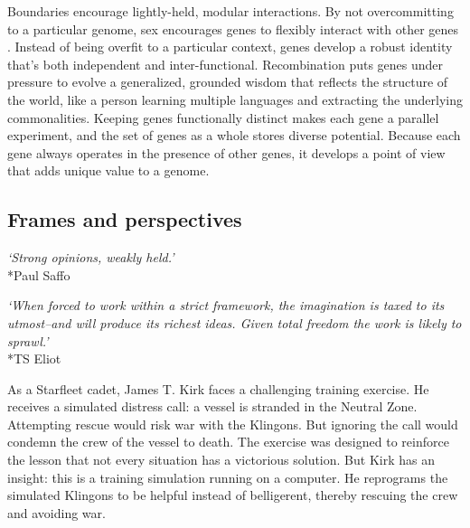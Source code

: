 \documentclass[12pt]{article}
\begin{document}
Boundaries encourage lightly-held, modular interactions. By not overcommitting to a particular genome, sex encourages genes to flexibly interact with other genes \citep{livnat2008mixability, livnat2010sex, wagner1996perspective, holland1975adaptation,dawkins1976selfish, clune2013evolutionary}. Instead of being overfit to a particular context, genes develop a robust identity that's both independent and inter-functional. Recombination puts genes under pressure to evolve a generalized, grounded wisdom that reflects the structure of the world, like a person learning multiple languages and extracting the underlying commonalities. Keeping genes functionally distinct makes each gene a parallel experiment, and the set of genes as a whole stores diverse potential. Because each gene always operates in the presence of other genes, it develops a point of view that adds unique value to a genome.



\subsection{Frames and perspectives} 

\begin{center}
\textit{`Strong opinions, weakly held.'}\\*Paul Saffo
\end{center}

\begin{center}
\textit{`When forced to work within a strict framework, the imagination is taxed to its utmost--and will produce its richest ideas. Given total freedom the work is likely to sprawl.'}\\*TS Eliot
\end{center}

As a Starfleet cadet, James T. Kirk faces a challenging training exercise. He receives a simulated distress call: a vessel is stranded in the Neutral Zone. Attempting rescue would risk war with the Klingons. But ignoring the call would condemn the crew of the vessel to death. The exercise was designed to reinforce the lesson that not every situation has a victorious solution. But Kirk has an insight: this is a training simulation running on a computer. He reprograms the simulated Klingons to be helpful instead of belligerent, thereby rescuing the crew and avoiding war. 
\end{document}
